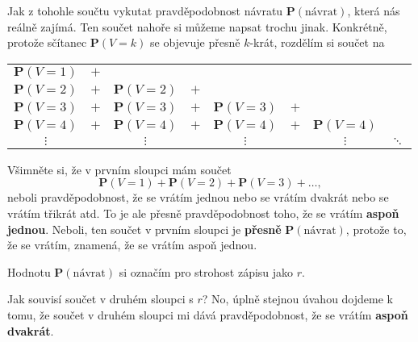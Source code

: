 \documentclass[a4paper,11pt]{article}
\theoremstyle{remark}
\renewcommand{\P}{\mathbf{P}}
\begin{document}
Jak z tohohle součtu vykutat pravděpodobnost návratu $\P(\text{návrat})$, která
nás reálně zajímá. Ten součet nahoře si můžeme napsat trochu jinak. Konkrétně,
protože sčítanec $\P(V=k)$ se objevuje přesně $k$-krát, rozdělím si součet na

\begin{center}
 \begin{tabular}{cccccccc}
  $\P(V=1)$ & $+$ & & & & & & \\[1ex]
  $\P(V=2)$ & $+$ & $\P(V=2)$ & $+$ & & & & \\[1ex]
  $\P(V=3)$ & $+$ & $\P(V=3)$ & $+$ & $\P(V=3)$ & $+$ & & \\[1ex]
  $\P(V=4)$ & $+$ & $\P(V=4)$ & $+$ & $\P(V=4)$ & $+$ & $\P(V=4)$ & \\[1ex]
  $\vdots$ & & $\vdots$ & & $\vdots$ & & $\vdots$ & $\ddots$ \\
 \end{tabular}
\end{center}

Všimněte si, že v prvním sloupci mám součet
\[
 \P(V=1) + \P(V=2) + \P(V=3) + \ldots,
\]
neboli pravděpodobnost, že se vrátím jednou nebo se vrátím dvakrát nebo se
vrátím třikrát atd. To je ale přesně pravděpodobnost toho, že se vrátím
\textbf{aspoň jednou}. Neboli, ten součet v prvním sloupci je \textbf{přesně}
$\P(\text{návrat})$, protože to, že se vrátím, znamená, že se vrátím aspoň
jednou.

Hodnotu $\P(\text{návrat})$ si označím pro strohost zápisu jako $r$.

Jak souvisí součet v druhém sloupci s $r$? No, úplně stejnou úvahou dojdeme k
tomu, že součet v druhém sloupci mi dává pravděpodobnost, že se vrátím
\textbf{aspoň dvakrát}.
\end{document}
